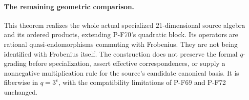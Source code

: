 \paragraph{The remaining geometric comparison.}
This theorem realizes the whole actual specialized
$21$-dimensional source algebra and its ordered
products, extending P-F70's quadratic block.
Its operators are rational quasi-endomorphisms
commuting with Frobenius.  They are not being
identified with Frobenius itself.  The construction
does not preserve the formal $q$-grading before
specialization, assert effective correspondences,
or supply a nonnegative multiplication rule for
the source's candidate canonical basis.  It is
fiberwise in $q=3^e$, with the compatibility
limitations of P-F69 and P-F72 unchanged.
